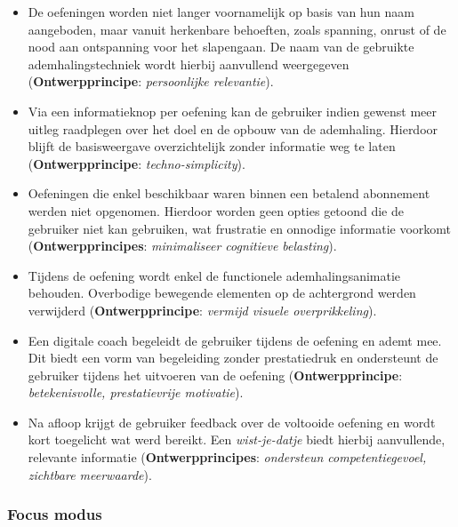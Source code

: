 {\small
    \begin{itemize}
        \item De oefeningen worden niet langer voornamelijk op basis van hun naam aangeboden, maar vanuit herkenbare behoeften, zoals spanning, onrust of de nood aan ontspanning voor het slapengaan. De naam van de gebruikte ademhalingstechniek wordt hierbij aanvullend weergegeven (\textbf{Ontwerpprincipe}: \textit{persoonlijke relevantie}).
        
        \item Via een informatieknop per oefening kan de gebruiker indien gewenst meer uitleg raadplegen over het doel en de opbouw van de ademhaling. Hierdoor blijft de basisweergave overzichtelijk zonder informatie weg te laten (\textbf{Ontwerpprincipe}: \textit{techno-simplicity}).
        
        \item Oefeningen die enkel beschikbaar waren binnen een betalend abonnement werden niet opgenomen. Hierdoor worden geen opties getoond die de gebruiker niet kan gebruiken, wat frustratie en onnodige informatie voorkomt (\textbf{Ontwerpprincipes}: \textit{minimaliseer cognitieve belasting}).
        
        \item Tijdens de oefening wordt enkel de functionele ademhalingsanimatie behouden. Overbodige bewegende elementen op de achtergrond werden verwijderd (\textbf{Ontwerpprincipe}: \textit{vermijd visuele overprikkeling}).
        
        \item Een digitale coach begeleidt de gebruiker tijdens de oefening en ademt mee. Dit biedt een vorm van begeleiding zonder prestatiedruk en ondersteunt de gebruiker tijdens het uitvoeren van de oefening (\textbf{Ontwerpprincipe}: \textit{betekenisvolle, prestatievrije motivatie}).
        
        \item Na afloop krijgt de gebruiker feedback over de voltooide oefening en wordt kort toegelicht wat werd bereikt. Een \textit{wist-je-datje} biedt hierbij aanvullende, relevante informatie (\textbf{Ontwerpprincipes}: \textit{ondersteun competentiegevoel, zichtbare meerwaarde}).
    \end{itemize}
}

\vspace{1em}

\subsubsection{Focus modus}
\label{subsubsec:focus-mockups}

